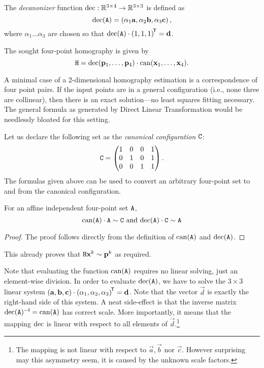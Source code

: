 \begin{definition}
The \textit{decanonizer} function $\mathrm{dec}: \mathbb{R}^{3\times 4} \to \mathbb{R}^{3\times 3}$ is defined as
$$\mathrm{dec}(\mathtt{A}) = \left( \alpha_1 \mathbf{a}, \alpha_2 \mathbf{b}, \alpha_3 \mathbf{c} \right),$$
where $\alpha_1 \dots \alpha_3$ are chosen so that $\mathrm{dec}(\mathtt{A}) \cdot \left( 1, 1, 1 \right)^{\!\mathsf{T}} = \mathbf{d}$.
\end{definition}

The sought four-point homography is given by
\begin{equation} \label{e:algo-homo}
\mathtt{H} = \mathrm{dec}(\mathbf{p}_1, \dots, \mathbf{p}_4) \cdot \mathrm{can}(\mathbf{x}_1, \dots, \mathbf{x}_4).
\end{equation}

A minimal case of a 2-dimensional homography estimation is a correspondence of four point pairs.
If the input points are in a general configuration (i.e., none three are collinear), then there is an exact solution---no least squares fitting necessary.
The general formula as generated by Direct Linear Transformation would be needlessly bloated for this setting.

Let us declare the following set as the \textit{canonical configuration} $\mathtt{C}$:
$$\mathtt{C} = \begin{pmatrix}
 1 & 0 & 0 & 1 \\
 0 & 1 & 0 & 1 \\
 0 & 0 & 1 & 1
 \end{pmatrix}.$$
The formulas given above can be used to convert an arbitrary four-point set to and from the canonical configuration.

\begin{lemma}
For an affine independent four-point set $\mathtt{A}$,
$$\mathrm{can}(\mathtt{A}) \cdot \mathtt{A} \sim \mathtt{C} \textrm{ and } \mathrm{dec}(\mathtt{A}) \cdot \mathtt{C} \sim \mathtt{A}$$
\end{lemma}
\begin{proof}
The proof follows directly from the definition of $\mathrm{can}(\mathtt{A})$ and $\mathrm{dec}(\mathtt{A})$.
\end{proof}
This already proves that $\mathtt{H} \mathbf{x}^k \sim \mathbf{p}^k$ as required.

Note that evaluating the function $\mathrm{can}(\mathtt{A})$ requires no linear solving, just an element-wise division.
In order to evaluate $\mathrm{dec}(\mathtt{A})$, we have to solve the $3 \times 3$ linear system $\left(\mathbf{a}, \mathbf{b}, \mathbf{c} \right) \cdot \left(\alpha_1, \alpha_2, \alpha_3 \right) ^{\!\mathsf{T}} = \mathbf{d}$.
Note that the vector $\vec d$ is exactly the right-hand side of this system.
A neat side-effect is that the inverse matrix $\mathrm{dec}(\mathtt{A}) ^{-\mathsf{I}} = \mathrm{can}(\mathtt{A})$ has correct scale. 
More importantly, it means that the mapping $\mathrm{dec}$ is linear with respect to all elements of $\vec d$.\footnote{
The mapping is not linear with respect to $\vec a, \vec b$ nor $\vec c$.
However surprising may this asymmetry seem, it is caused by the unknown scale factors.
}

